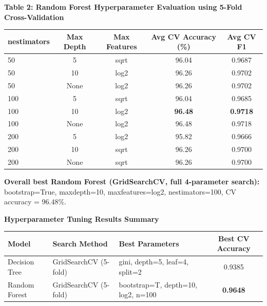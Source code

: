 \documentclass[12pt,a4paper]{article}
\newenvironment{fitwidth}
  {\begin{lrbox}{\fitbox}}
  {\end{lrbox}\ifdim\wd\fitbox>\linewidth\resizebox{\linewidth}{!}{\usebox{\fitbox}}\else\usebox{\fitbox}\fi}
\DeclareRobustCommand{\_}{\textunderscore\allowbreak}
\begin{document}
\vspace{0.3cm}
\begin{center}
\begin{minipage}{\linewidth}\centering
\textbf{Table 2: Random Forest Hyperparameter Evaluation using 5-Fold Cross-Validation}\par\smallskip
\begin{fitwidth}
\begin{tabular}{lcccc}
\toprule
n\_estimators & Max Depth & Max Features & Avg CV Accuracy (\%) & Avg CV F1 \\
\midrule
50  & 5    & sqrt & 96.04 & 0.9687 \\
50  & 10   & log2 & 96.26 & 0.9702 \\
50  & None & log2 & 96.26 & 0.9702 \\
100 & 5    & sqrt & 96.04 & 0.9685 \\
100 & 10   & log2 & \textbf{96.48} & \textbf{0.9718} \\
100 & None & log2 & 96.48 & 0.9718 \\
200 & 5    & log2 & 95.82 & 0.9666 \\
200 & 10   & sqrt & 96.26 & 0.9700 \\
200 & None & sqrt & 96.26 & 0.9700 \\
\bottomrule
\end{tabular}
\end{fitwidth}
\end{minipage}
\end{center}

\vspace{0.2cm}
\noindent \textbf{Overall best Random Forest (GridSearchCV, full 4-parameter
search):} bootstrap=True, max\_depth=10, max\_features=log2,
n\_estimators=100, CV accuracy = 96.48\%.

\vspace{0.3cm}
\begin{center}
\begin{minipage}{\linewidth}\centering
\textbf{Hyperparameter Tuning Results Summary}\par\smallskip
\begin{fitwidth}
\begin{tabular}{lllc}
\toprule
Model & Search Method & Best Parameters & Best CV Accuracy \\
\midrule
Decision Tree & GridSearchCV (5-fold) & gini, depth=5, leaf=4, split=2 & 0.9385 \\
Random Forest & GridSearchCV (5-fold) & bootstrap=T, depth=10, log2, n=100 & \textbf{0.9648} \\
\bottomrule
\end{tabular}
\end{fitwidth}
\end{minipage}
\end{center}
\end{document}

